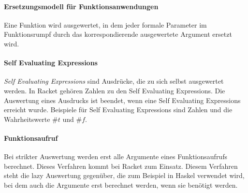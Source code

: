 \documentclass[../main.tex]{subfiles}
\begin{document}
        \paragraph{Ersetzungsmodell für Funktionsanwendungen}
            Eine Funktion wird ausgewertet, in dem jeder formale Parameter im Funktionsrumpf durch das korrespondierende ausgewertete Argument ersetzt wird.
            
        \paragraph{Self Evaluating Expressions}
            \emph{Self Evaluating Expressions} sind Ausdrücke, die zu sich selbst ausgewertet werden. In Racket gehören Zahlen zu den Self Evaluating Expressions. Die Auswertung eines Ausdrucks ist beendet, wenn eine Self Evaluating Expressions erreicht wurde. Beispiele für Self Evaluating Expressions sind Zahlen und die Wahrheitswerte $\#t$ und $\#f$.
            
        \paragraph{Funktionsaufruf}
            Bei strikter Auswertung werden erst alle Argumente eines Funktionsaufrufs berechnet. Dieses Verfahren kommt bei Racket zum Einsatz. Diesem Verfahren steht die lazy Auswertung gegenüber, die zum Beispiel in Haskel verwendet wird, bei dem auch die Argumente erst berechnet werden, wenn sie benötigt werden.         
\end{document}
